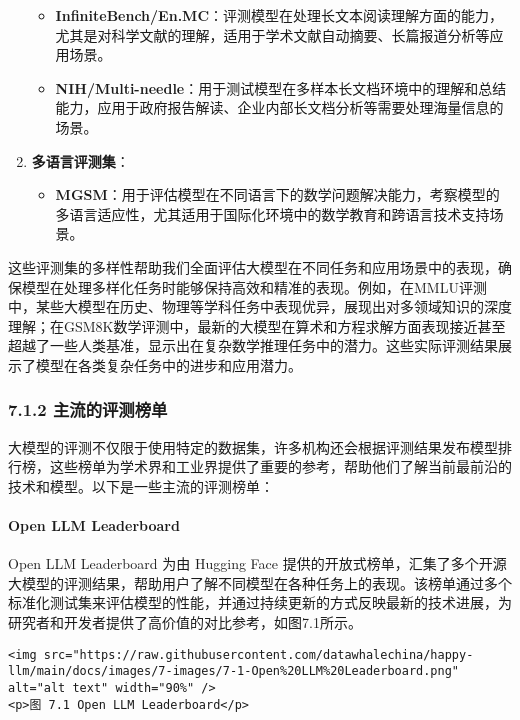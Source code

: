 \documentclass[
]{article}
\providecommand{\tightlist}{%
  \setlength{\itemsep}{0pt}\setlength{\parskip}{0pt}}
\begin{document}
\begin{enumerate}
  \begin{itemize}
  \tightlist
  \item
    \textbf{InfiniteBench/En.MC}：评测模型在处理长文本阅读理解方面的能力，尤其是对科学文献的理解，适用于学术文献自动摘要、长篇报道分析等应用场景。
  \item
    \textbf{NIH/Multi-needle}：用于测试模型在多样本长文档环境中的理解和总结能力，应用于政府报告解读、企业内部长文档分析等需要处理海量信息的场景。
  \end{itemize}
\item
  \textbf{多语言评测集}：

  \begin{itemize}
  \tightlist
  \item
    \textbf{MGSM}：用于评估模型在不同语言下的数学问题解决能力，考察模型的多语言适应性，尤其适用于国际化环境中的数学教育和跨语言技术支持场景。
  \end{itemize}
\end{enumerate}

这些评测集的多样性帮助我们全面评估大模型在不同任务和应用场景中的表现，确保模型在处理多样化任务时能够保持高效和精准的表现。例如，在MMLU评测中，某些大模型在历史、物理等学科任务中表现优异，展现出对多领域知识的深度理解；在GSM8K数学评测中，最新的大模型在算术和方程求解方面表现接近甚至超越了一些人类基准，显示出在复杂数学推理任务中的潜力。这些实际评测结果展示了模型在各类复杂任务中的进步和应用潜力。

\subsubsection{7.1.2
主流的评测榜单}\label{ux4e3bux6d41ux7684ux8bc4ux6d4bux699cux5355}

大模型的评测不仅限于使用特定的数据集，许多机构还会根据评测结果发布模型排行榜，这些榜单为学术界和工业界提供了重要的参考，帮助他们了解当前最前沿的技术和模型。以下是一些主流的评测榜单：

\paragraph{Open LLM Leaderboard}\label{open-llm-leaderboard}

Open LLM Leaderboard 为由 Hugging Face
提供的开放式榜单，汇集了多个开源大模型的评测结果，帮助用户了解不同模型在各种任务上的表现。该榜单通过多个标准化测试集来评估模型的性能，并通过持续更新的方式反映最新的技术进展，为研究者和开发者提供了高价值的对比参考，如图7.1所示。

\begin{verbatim}
<img src="https://raw.githubusercontent.com/datawhalechina/happy-llm/main/docs/images/7-images/7-1-Open%20LLM%20Leaderboard.png" alt="alt text" width="90%" />
<p>图 7.1 Open LLM Leaderboard</p>
\end{verbatim}
\end{document}
